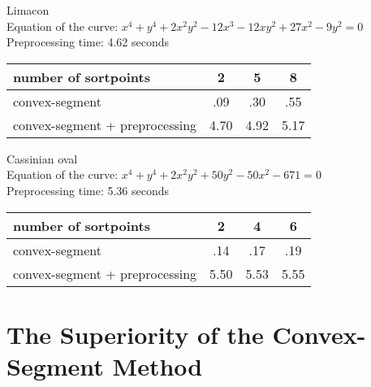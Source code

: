\begin{example}
\label{eg-limacon}
Limacon\\
Equation of the curve: $x^{4} + y^{4} + 2x^{2}y^{2} - 12x^{3} - 12xy^{2} + 27x^{2} - 9y^{2} = 0$\\
Preprocessing time: 4.62\vspace{.5in} seconds\\
%
\begin{tabular}{|l|c|c|c|} \hline
number of sortpoints & 2 & 5 & 8 \\ \hline \hline
convex-segment & .09 & .30 & .55 \\ \hline
convex-segment + preprocessing & 4.70 & 4.92 & 5.17 \\ \hline
\end{tabular}
\end{example}
%
\begin{example}
\label{eg-Cassinian}
Cassinian oval\\
Equation of the curve: $x^{4} + y^{4} + 2x^{2}y^{2} + 50y^{2} - 50x^{2}-671 = 0$\\
Preprocessing time: 5.36\vspace{.5in} seconds\\
%
\begin{tabular}{|l|c|c|c|} \hline
number of sortpoints & 2 & 4 & 6 \\ \hline \hline
convex-segment & .14 & .17 & .19 \\ \hline
convex-segment + preprocessing & 5.50 & 5.53 & 5.55 \\ \hline
\end{tabular}
\end{example}
%
\section{The Superiority of the Convex-Segment Method}


